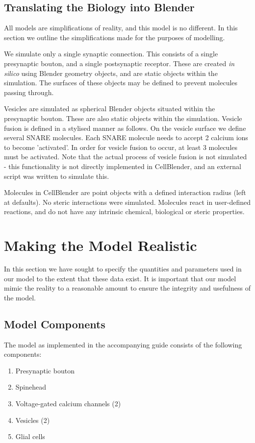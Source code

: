 \documentclass[a4paper]{article}
\begin{document}
\subsection{Translating the Biology into Blender}
All models are simplifications of reality, and this model is no different. In this section we outline the simplifications made for the purposes of modelling.

We simulate only a single synaptic connection. This consists of a single presynaptic bouton, and a single postsynaptic receptor. These are created \textit{in silico} using Blender geometry objects, and are static objects within the simulation. The surfaces of these objects may be defined to prevent molecules passing through.

Vesicles are simulated as spherical Blender objects situated within the presynaptic bouton. These are also static objects within the simulation. Vesicle fusion is defined in a stylised manner as follows. On the vesicle surface we define several SNARE molecules. Each SNARE molecule needs to accept 2 calcium ions to become 'activated'. In order for vesicle fusion to occur, at least 3 molecules must be activated. Note that the actual process of vesicle fusion is not simulated - this functionality is not directly implemented in CellBlender, and an external script was written to simulate this.

Molecules in CellBlender are point objects with a defined interaction radius (left at defaults). No steric interactions were simulated. Molecules react in user-defined reactions, and do not have any intrinsic chemical, biological or steric properties. 

\section{Making the Model Realistic}
In this section we have sought to specify the quantities and parameters used in our model to the extent that these data exist. It is important that our model mimic the reality to a reasonable amount to ensure the integrity and usefulness of the model.

\subsection{Model Components}
The model as implemented in the accompanying guide consists of the following components:
\begin{enumerate} 
    \item Presynaptic bouton
    \item Spinehead
    \item Voltage-gated calcium channels (2)
    \item Vesicles (2)
    \item Glial cells
\end{enumerate}
\end{document}
